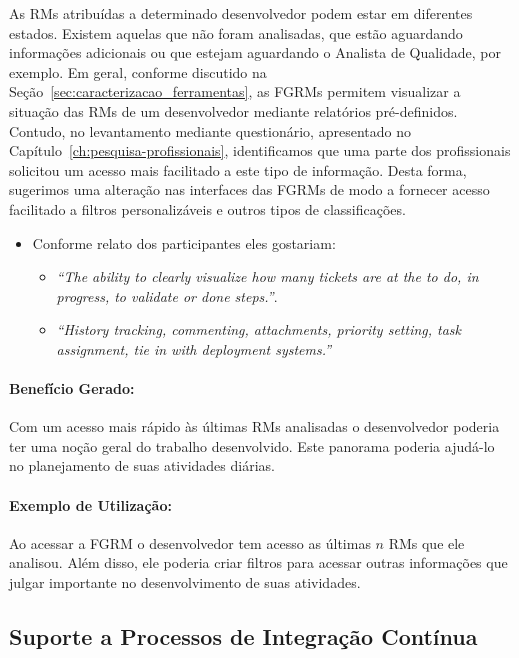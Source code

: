 As RMs atribuídas a determinado desenvolvedor podem estar em diferentes estados.
Existem aquelas que não foram analisadas, que estão aguardando informações
adicionais ou que estejam aguardando o Analista de Qualidade, por exemplo. Em
geral, conforme discutido na Seção~\ref{sec:caracterizacao_ferramentas}, as
FGRMs permitem visualizar a situação das RMs de um desenvolvedor mediante
relatórios pré-definidos. Contudo, no levantamento mediante questionário,
apresentado no Capítulo~\ref{ch:pesquisa-profissionais}, identificamos que uma
parte dos profissionais solicitou um acesso mais facilitado a este tipo de
informação. Desta forma, sugerimos uma alteração nas interfaces das FGRMs de
modo a fornecer acesso facilitado a filtros personalizáveis e outros tipos de
classificações.

\begin{itemize}
	\item Conforme relato dos participantes eles gostariam:
	\begin{itemize}
		\item \textit{``The ability to clearly visualize how many tickets are at
				the to do, in progress, to validate or done steps.''}.
		\item \textit{``History tracking, commenting, attachments, priority
				setting, task assignment, tie in with deployment systems.''}
	\end{itemize}
\end{itemize}

\paragraph{Benefício Gerado:}
\label{par:papéis_afetados_s04}

Com um acesso mais rápido às últimas RMs analisadas o desenvolvedor poderia ter
uma noção geral do trabalho desenvolvido. Este panorama poderia ajudá-lo no
planejamento de suas atividades diárias.

\paragraph{Exemplo de Utilização:}
\label{par:exemplo_de_utilização_s04}

Ao acessar a FGRM o desenvolvedor tem acesso as últimas $n$ RMs que ele
analisou. Além disso, ele poderia criar filtros para acessar outras informações
que julgar importante no desenvolvimento de suas atividades.

\subsection{Suporte a Processos de Integração Contínua}
\label{sub:suporte_integracao_continua}

